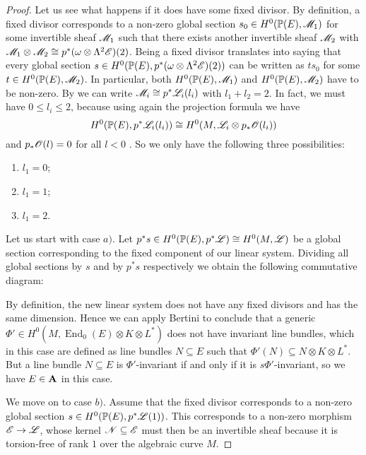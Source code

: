 \documentclass[A4paper, 12pt, british, reqno]{amsart}
\DeclareMathOperator{\End}{End}
\newcommand{\ot}{\otimes}
\newcommand{\dual}{^{*}}
\begin{document}
\begin{prop}
\begin{proof}
	Let us see what happens if it does have some fixed divisor.
	By definition, a fixed divisor corresponds to a non-zero global section $s_{0}\in H^{0}(\mathbb{P}(E),\mathscr{M}_{1})$ for some invertible sheaf $\mathscr{M}_{1}$ such that there exists another invertible sheaf $\mathscr{M}_{2}$ with $\M_{1}\ot \M_{2}\cong p^{*}(\w\ot\Lambda^{2}\E)(2)$.
	Being a fixed divisor translates into saying that every global section $s\in H^{0}(\P(E),p^{*}(\w\ot \Lambda^{2}\E)(2))$ can be written as $ts_{0}$ for some $t\in H^{0}(\mathbb{P}(E),\mathscr{M}_{2})$.
	In particular, both $H^{0}(\mathbb{P}(E),\mathscr{M}_{1})$ and $H^{0}(\mathbb{P}(E),\mathscr{M}_{2})$ have to be non-zero.
	By \cite[Exercise II.7.4]{har77} we can write $\mathscr{M}_{i}\cong p^{*}\mathscr{L}_{i}(l_{i})$ with $l_{1}+l_{2}=2$.
	In fact, we must have $0\leqslant l_{i}\leqslant 2$, because using again the projection formula we have
	\[ H^{0}(\P(E),p^{*}\L_{i}(l_{i}))\cong H^{0}(M,\L_{i}\ot p_{*}\O(l_{i})) \]
	and $p_{*}\mathscr{O}(l)=0$ for all $l<0$ \cite[Exercise III.8.4]{har77}.
	So we only have the following three possibilities:
	\begin{enumerate}[label=\alph*)]
	    \item $l_{1}=0$;
	    \item $l_{1}=1$;
	    \item $l_{1}=2$.
	\end{enumerate}
	Let us start with case $a)$.
	Let $p^{*}s\in H^{0}(\mathbb{P}(E),p^{*}\mathscr{L})\cong H^{0}(M,\mathscr{L})$ be a global section corresponding to the fixed component of our linear system.
	Dividing all global sections by $s$ and by $p^{*}s$ respectively we obtain the following commutative diagram:
	\begin{center}
	\end{center}
	By definition, the new linear system does not have any fixed divisors and has the same dimension.
	Hence we can apply Bertini to conclude that a generic $\Phi'\in H^{0}(M,\End_{0}(E)\ot K\ot L\dual)$ does not have invariant line bundles, which in this case are defined as line bundles $N\subseteq E$ such that $\Phi'(N)\subseteq N\ot K\ot L\dual$.
	But a line bundle $N\subseteq E$ is $\Phi'$-invariant if and only if it is $s\Phi'$-invariant, so we have $E\in \mathbf{A}$ in this case.

	We move on to case $b)$.
	Assume that the fixed divisor corresponds to a non-zero global section $s\in H^{0}(\mathbb{P}(E),p^{*}\mathscr{L}(1))$.
	This corresponds to a non-zero morphism $\mathscr{E}\to \mathscr{L}$, whose kernel $\mathscr{N}\subseteq \mathscr{E}$ must then be an invertible sheaf because it is torsion-free of rank $1$ over the algebraic curve $M$.
    \end{proof}
\end{prop}



\vspace{0.3cm}
\end{document}
